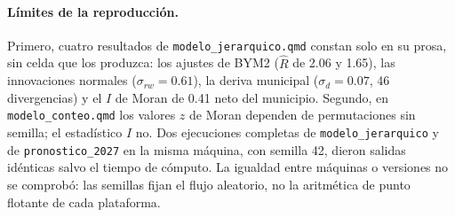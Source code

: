 \paragraph{Límites de la reproducción.} Primero, cuatro resultados de
\texttt{modelo\_jerarquico.qmd} constan solo en su prosa, sin celda que los
produzca: los ajustes de BYM2 ($\hat{R}$ de 2.06 y 1.65), las innovaciones normales
($\sigma_{rw} = 0.61$), la deriva municipal ($\sigma_d = 0.07$, 46 divergencias) y
el $I$ de Moran de 0.41 neto del municipio. Segundo, en
\texttt{modelo\_conteo.qmd} los valores $z$ de Moran dependen de permutaciones sin
semilla; el estadístico $I$ no. Dos ejecuciones
completas de \texttt{modelo\_jerarquico} y de \texttt{pronostico\_2027} en la
misma máquina, con semilla 42, dieron salidas idénticas salvo el tiempo de
cómputo. La igualdad entre máquinas o versiones no se comprobó: las semillas
fijan el flujo aleatorio, no la aritmética de punto flotante de cada
plataforma.
